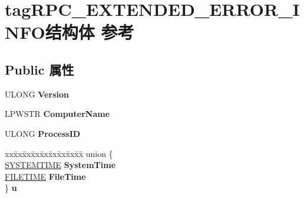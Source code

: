 \hypertarget{structtag_r_p_c___e_x_t_e_n_d_e_d___e_r_r_o_r___i_n_f_o}{}\section{tag\+R\+P\+C\+\_\+\+E\+X\+T\+E\+N\+D\+E\+D\+\_\+\+E\+R\+R\+O\+R\+\_\+\+I\+N\+F\+O结构体 参考}
\label{structtag_r_p_c___e_x_t_e_n_d_e_d___e_r_r_o_r___i_n_f_o}
\subsection*{Public 属性}
\begin{DoxyCompactItemize}
\item 
\mbox{\label{structtag_r_p_c___e_x_t_e_n_d_e_d___e_r_r_o_r___i_n_f_o_a9b54e5e32d728efd06bef8c997bc58d6}} 
U\+L\+O\+NG {\bfseries Version}
\item 
\mbox{\label{structtag_r_p_c___e_x_t_e_n_d_e_d___e_r_r_o_r___i_n_f_o_a00ee250710b70f8c2b94fa89b9d386fc}} 
L\+P\+W\+S\+TR {\bfseries Computer\+Name}
\item 
\mbox{\label{structtag_r_p_c___e_x_t_e_n_d_e_d___e_r_r_o_r___i_n_f_o_ad7079b01d3ca71e05a441f014bc1d993}} 
U\+L\+O\+NG {\bfseries Process\+ID}
\item 
\mbox{\label{structtag_r_p_c___e_x_t_e_n_d_e_d___e_r_r_o_r___i_n_f_o_a9b7c4503e2614b718e28825fb4413674}} 
\begin{tabbing}
xx\=xx\=xx\=xx\=xx\=xx\=xx\=xx\=xx\=\kill
union \{\\
\>\hyperlink{struct___s_y_s_t_e_m_t_i_m_e}{SYSTEMTIME} {\bfseries SystemTime}\\
\>\hyperlink{struct___f_i_l_e_t_i_m_e}{FILETIME} {\bfseries FileTime}\\
\} {\bfseries u}\\


\end{tabbing}
\end{DoxyCompactItemize}
